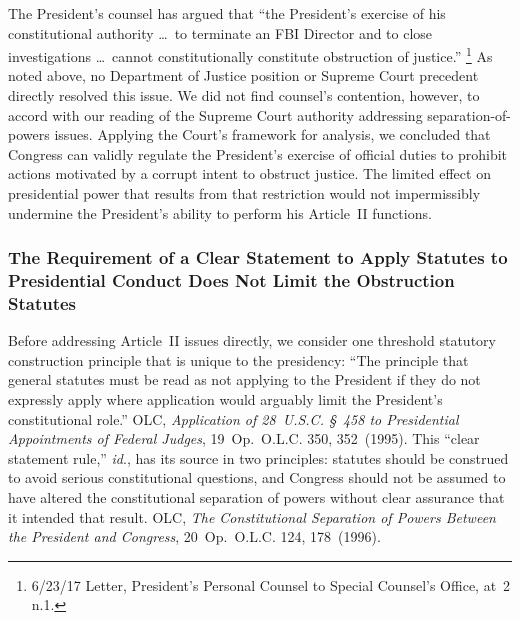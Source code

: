 The President's counsel has argued that ``the President's exercise of his constitutional authority \dots\ to terminate an FBI Director and to close investigations \dots\ cannot constitutionally constitute obstruction of justice.''%
\footnote{6/23/17 Letter, President's Personal Counsel to Special Counsel's Office, at~2 n.1.}
As noted above, no Department of Justice position or Supreme Court precedent directly resolved this issue.
We did not find counsel's contention, however, to accord with our reading of the Supreme Court authority addressing separation-of-powers issues.
Applying the Court's framework for analysis, we concluded that Congress can validly regulate the President's exercise of official duties to prohibit actions motivated by a corrupt intent to obstruct justice.
The limited effect on presidential power that results from that restriction would not impermissibly undermine the President's ability to perform his Article~II functions.

\subsubsection{The Requirement of a Clear Statement to Apply Statutes to Presidential Conduct Does Not Limit the Obstruction Statutes}

Before addressing Article~II issues directly, we consider one threshold statutory construction principle that is unique to the presidency: ``The principle that general statutes must be read as not applying to the President if they do not expressly apply where application would arguably limit the President's constitutional role.''
OLC, \textit{Application of 28~U.S.C. \S~458 to Presidential Appointments of Federal Judges}, 19~Op.\ O.L.C. 350, 352~(1995).
This ``clear statement rule,'' \textit{id}., has its source in two principles: statutes should be construed to avoid serious constitutional questions, and Congress should not be assumed to have altered the constitutional separation of powers without clear assurance that it intended that result.
OLC, \textit{The Constitutional Separation of Powers Between the President and Congress}, 20~Op.\ O.L.C. 124, 178~(1996).

